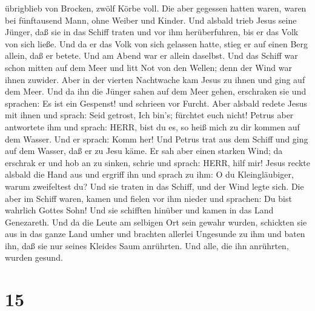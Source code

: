 übrigblieb von Brocken, zwölf Körbe voll.  Die aber
gegessen hatten waren, waren bei fünftausend Mann, ohne Weiber und
Kinder.  Und alsbald trieb Jesus seine Jünger, daß sie in
das Schiff traten und vor ihm herüberfuhren, bis er das Volk von sich
ließe.  Und da er das Volk von sich gelassen hatte, stieg
er auf einen Berg allein, daß er betete. Und am Abend war er allein
daselbst.  Und das Schiff war schon mitten auf dem Meer und
litt Not von den Wellen; denn der Wind war ihnen zuwider. 
Aber in der vierten Nachtwache kam Jesus zu ihnen und ging auf dem Meer.
 Und da ihn die Jünger sahen auf dem Meer gehen, erschraken
sie und sprachen: Es ist ein Gespenst! und schrieen vor Furcht.
 Aber alsbald redete Jesus mit ihnen und sprach: Seid
getrost, Ich bin's; fürchtet euch nicht!  Petrus aber
antwortete ihm und sprach: HERR, bist du es, so heiß mich zu dir kommen
auf dem Wasser.  Und er sprach: Komm her! Und Petrus trat
aus dem Schiff und ging auf dem Wasser, daß er zu Jesu käme.
 Er sah aber einen starken Wind; da erschrak er und hob an
zu sinken, schrie und sprach: HERR, hilf mir!  Jesus reckte
alsbald die Hand aus und ergriff ihn und sprach zu ihm: O du
Kleingläubiger, warum zweifeltest du?  Und sie traten in
das Schiff, und der Wind legte sich.  Die aber im Schiff
waren, kamen und fielen vor ihm nieder und sprachen: Du bist wahrlich
Gottes Sohn!  Und sie schifften hinüber und kamen in das
Land Genezareth.  Und da die Leute am selbigen Ort sein
gewahr wurden, schickten sie aus in das ganze Land umher und brachten
allerlei Ungesunde zu ihm  und baten ihn, daß sie nur
seines Kleides Saum anrührten. Und alle, die ihn anrührten, wurden
gesund.

\hypertarget{section-14}{%
\section{15}\label{section-14}}

